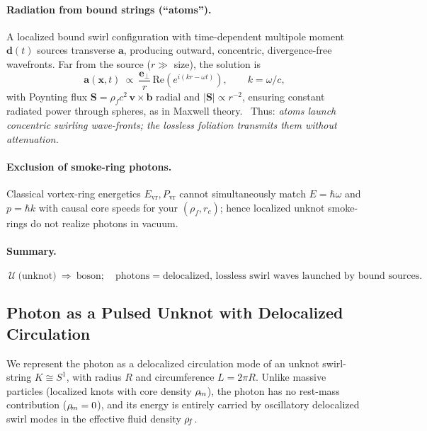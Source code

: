 \documentclass[11pt]{article}
\begin{document}
    \paragraph{Radiation from bound strings (``atoms'').}
    A localized bound swirl configuration with time-dependent multipole moment $\mathbf{d}(t)$ sources transverse $\mathbf{a}$, producing outward, concentric, divergence-free wavefronts. Far from the source ($r\gg$ size), the solution is
    \[
    \mathbf{a}(\mathbf{x},t)\ \propto\ \frac{\mathbf{e}_\perp}{r}\,\mathrm{Re}\!\left(e^{i(kr-\omega t)}\right),\qquad k=\omega/c,
    \]
    with Poynting flux $\mathbf{S}=\rho_f c^2\,\mathbf{v}\times\mathbf{b}$ radial and $|\mathbf{S}|\propto r^{-2}$, ensuring constant radiated power through spheres, as in Maxwell theory.~\cite{Jackson1999}
    Thus: \emph{atoms launch concentric swirling wave-fronts; the lossless foliation transmits them without attenuation.}

    \paragraph{Exclusion of smoke-ring photons.}
    Classical vortex-ring energetics $E_{\mathrm{vr}},P_{\mathrm{vr}}$ cannot simultaneously match $E=\hbar\omega$ and $p=\hbar k$ with causal core speeds for your $(\rho_f,r_c)$; hence localized unknot smoke-rings do not realize photons in vacuum.~\cite{Saffman1992,Batchelor1967}

    \paragraph{Summary.}
    \[
    \boxed{\ \mathcal U\ \text{(unknot)}\ \Rightarrow\ \text{boson};\quad
    \text{photons}=\text{delocalized, lossless swirl waves launched by bound sources.}\ }
    \]


\subsection{Photon as a Pulsed Unknot with Delocalized Circulation}

    We represent the photon as a delocalized circulation mode of an unknot swirl-string $K \cong S^1$, with radius $R$ and circumference $L=2\pi R$.  Unlike massive particles (localized knots with core density $\rho_{\!m}$), the photon has no rest-mass contribution ($\rho_{\!m} = 0$), and its energy is entirely carried by oscillatory delocalized swirl modes in the effective fluid density $\rho_{\!f}$.
\end{document}
